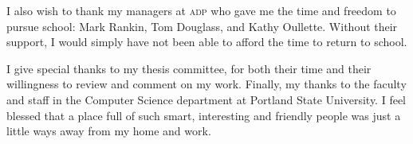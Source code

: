 I also wish to thank my managers at \textsc{adp} who gave me the time
and freedom to pursue school: Mark Rankin, Tom Douglass, and Kathy
Oullette. Without their support, I would simply have not been able to
afford the time to return to school.

I give special thanks to my thesis committee, for both their time and
their willingness to review and comment on my work. Finally, my thanks to
the faculty and staff in the Computer Science department at Portland
State University. I feel blessed that a place full of such smart,
interesting and friendly people was just a little ways away from my
home and work.

\newpage

\singlespacing
\tableofcontents
\newpage
{}
\listoffigures
\newpage

